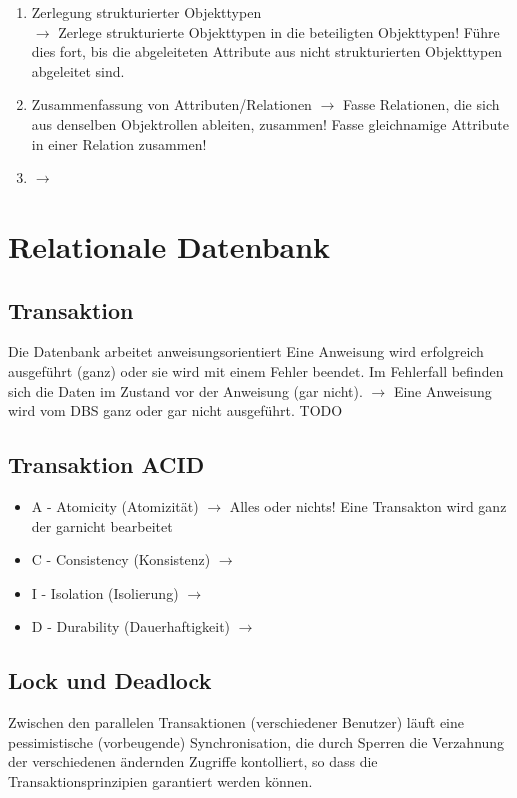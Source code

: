 \documentclass[a4paper,10pt]{scrartcl}
\begin{document}
\begin{enumerate}
    \item  Zerlegung strukturierter Objekttypen \\
    $\rightarrow$ Zerlege strukturierte Objekttypen in die beteiligten Objekttypen! Führe dies fort, bis die abgeleiteten Attribute aus nicht strukturierten Objekttypen abgeleitet sind. 
    \item Zusammenfassung von Attributen/Relationen
    $\rightarrow$ Fasse Relationen, die sich aus denselben Objektrollen ableiten, zusammen! Fasse gleichnamige Attribute in einer Relation zusammen!
    
    \item  
    $\rightarrow$
\end{enumerate}
\newpage
\section{Relationale Datenbank}
\subsection{Transaktion}
Die Datenbank arbeitet anweisungsorientiert 
Eine Anweisung wird erfolgreich ausgeführt (ganz) oder sie wird mit einem Fehler beendet. Im Fehlerfall befinden sich die Daten im Zustand vor der Anweisung (gar nicht). \newline
$\rightarrow$ Eine Anweisung wird vom DBS ganz oder gar nicht ausgeführt.
TODO
\subsection{Transaktion ACID}
\begin{itemize}
    \item A - Atomicity (Atomizität) \newline
    $\rightarrow$ Alles oder nichts! Eine Transakton wird ganz der garnicht bearbeitet
    \item C - Consistency (Konsistenz) \newline
    $\rightarrow$
    \item I - Isolation (Isolierung) \newline
    $\rightarrow$
    \item D - Durability (Dauerhaftigkeit) \newline
    $\rightarrow$
\end{itemize}
\subsection{Lock und Deadlock}
Zwischen den parallelen Transaktionen (verschiedener Benutzer) läuft eine pessimistische (vorbeugende) Synchronisation, die durch Sperren die Verzahnung der verschiedenen ändernden Zugriffe kontolliert, so dass die Transaktionsprinzipien garantiert werden können.
\end{document}
